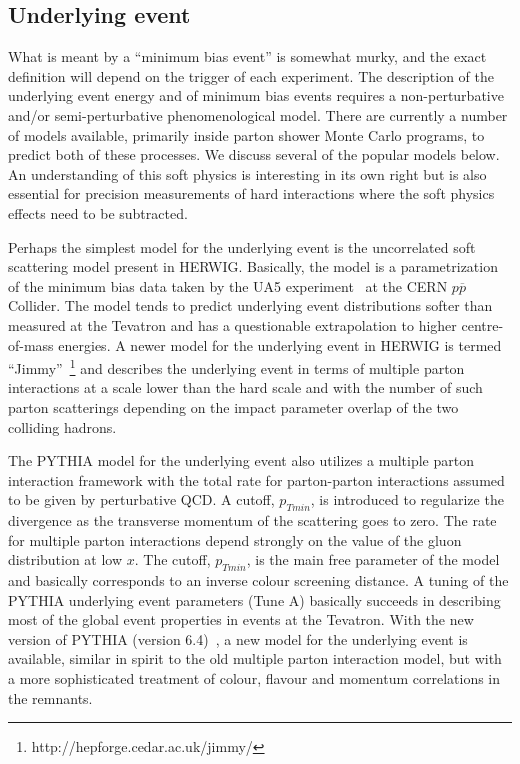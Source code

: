 \documentclass[12pt]{iopart}
\begin{document}
\subsection{Underlying event}
\label{sec:UE}

What is meant by a ``minimum bias event'' is somewhat murky, and the exact definition will depend on the trigger of each experiment. The
description of the underlying event energy and of minimum bias events requires a non-perturbative and/or semi-perturbative
phenomenological model. There are currently a number of models available, primarily inside parton shower Monte Carlo programs, to
predict both of these processes. We discuss several of the popular models below. An understanding of this soft physics is interesting
in its own right but is also essential for precision measurements of hard interactions where the soft physics effects need to be
subtracted. 

Perhaps the simplest model for the underlying event is the uncorrelated soft scattering model present in HERWIG. Basically, the model is
a parametrization of the minimum bias data taken by the UA5 experiment~\cite{Alner:1987wb} at the CERN $p\overline{p}$ Collider. The
model tends to predict underlying event distributions softer than measured at the Tevatron and has a questionable extrapolation to
higher centre-of-mass energies. A newer model for the underlying event in HERWIG is termed ``Jimmy''~\footnote{
http://hepforge.cedar.ac.uk/jimmy/} and describes the underlying event in terms of multiple parton interactions at a scale lower than
the hard scale and with the number of such parton scatterings depending on the impact parameter overlap of the two colliding hadrons. 

The PYTHIA model for the underlying event also utilizes a multiple parton interaction framework with the total rate for parton-parton
interactions assumed to be given by perturbative QCD. A cutoff, $p_{Tmin}$, is introduced to regularize the divergence as the
transverse momentum of the scattering goes to zero. The rate for multiple parton interactions depend strongly on the value of the gluon
distribution at low  $x$.  The cutoff, $p_{Tmin}$,  is the main free parameter of the model and basically corresponds to an inverse
colour screening distance. A tuning of the PYTHIA underlying event parameters (Tune A) basically succeeds in describing most of the
global event properties in events at the Tevatron. With the new version of
PYTHIA (version 6.4)~\cite{Sjostrand:2004ef,Sjostrand:2006za}, a new model for the underlying event is available,
similar in spirit to the old multiple parton interaction model,
but with a more sophisticated treatment of colour, flavour and momentum correlations in the remnants. 
\end{document}
